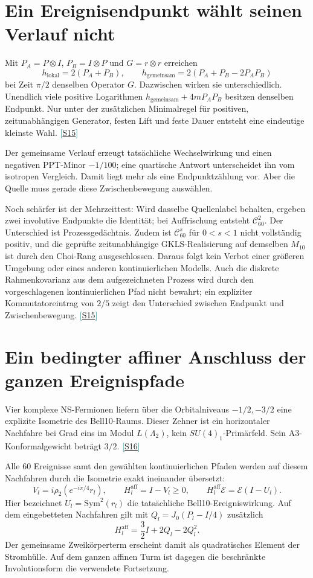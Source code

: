 \documentclass[11pt,a4paper,oneside,parskip=half,headings=normal,numbers=noenddot,bibliography=totoc]{scrreprt}
\newcommand{\src}[1]{\textcolor{teal}{\small[\hyperref[s:#1]{S#1}]}}
\begin{document}
\section{Ein Ereignisendpunkt wählt seinen Verlauf nicht}
Mit $P_A=P\otimes I$, $P_B=I\otimes P$ und $G=r\otimes r$ erreichen
\[
 h_{\mathrm{lokal}}=2(P_A+P_B),\qquad
 h_{\mathrm{gemeinsam}}=2(P_A+P_B-2P_AP_B)
\]
bei Zeit $\pi/2$ denselben Operator $G$. Dazwischen wirken sie unterschiedlich. Unendlich viele positive Logarithmen $h_{\mathrm{gemeinsam}}+4mP_AP_B$ besitzen denselben Endpunkt. Nur unter der zusätzlichen Minimalregel für positiven, zeitunabhängigen Generator, festen Lift und feste Dauer entsteht eine eindeutige kleinste Wahl. \src{15}

Der gemeinsame Verlauf erzeugt tatsächliche Wechselwirkung und einen negativen PPT-Minor $-1/100$; eine quartische Antwort unterscheidet ihn vom isotropen Vergleich. Damit liegt mehr als eine Endpunktzählung vor. Aber die Quelle muss gerade diese Zwischenbewegung auswählen.

Noch schärfer ist der Mehrzeittest: Wird dasselbe Quellenlabel behalten, ergeben zwei involutive Endpunkte die Identität; bei Auffrischung entsteht $\mathcal C_{60}^2$. Der Unterschied ist Prozessgedächtnis. Zudem ist $\mathcal C_{60}^{s}$ für $0<s<1$ nicht vollständig positiv, und die geprüfte zeitunabhängige GKLS-Realisierung auf demselben $M_{10}$ ist durch den Choi-Rang ausgeschlossen. Daraus folgt kein Verbot einer größeren Umgebung oder eines anderen kontinuierlichen Modells. Auch die diskrete Rahmenkovarianz aus dem aufgezeichneten Prozess wird durch den vorgeschlagenen kontinuierlichen Pfad nicht bewahrt; ein expliziter Kommutatoreintrag von $2/5$ zeigt den Unterschied zwischen Endpunkt und Zwischenbewegung. \src{15}

\section{Ein bedingter affiner Anschluss der ganzen Ereignispfade}
Vier komplexe NS-Fermionen liefern über die Orbitalniveaus $-1/2,-3/2$ eine explizite Isometrie des Bell10-Raums. Dieser Zehner ist ein horizontaler Nachfahre bei Grad eins im Modul $L(\Lambda_2)$, kein $SU(4)_1$-Primärfeld. Sein A3-Konformalgewicht beträgt $3/2$. \src{16}

Alle 60 Ereignisse samt den gewählten kontinuierlichen Pfaden werden auf diesem Nachfahren durch die Isometrie exakt ineinander übersetzt:
\[
 V_l=i\rho_2(e^{-i\pi/4}r_l),\qquad
 H_l^{\mathrm{aff}}=I-V_l\ge0,\qquad
 H_l^{\mathrm{aff}}\mathcal E=\mathcal E(I-U_l).
\]
Hier bezeichnet $U_l=\mathrm{Sym}^2(r_l)$ die tatsächliche Bell10-Ereigniswirkung. Auf dem eingebetteten Nachfahren gilt mit $Q_l=J_0(P_l-I/4)$ zusätzlich
\[
 H_l^{\mathrm{aff}}=\frac32I+2Q_l-2Q_l^2.
\]
Der gemeinsame Zweikörperterm erscheint damit als quadratisches Element der Stromhülle. Auf dem ganzen affinen Turm ist dagegen die beschränkte Involutionsform die verwendete Fortsetzung.
\end{document}
